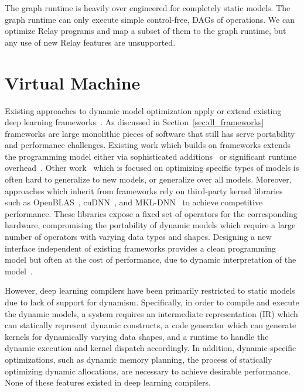 The graph runtime is heavily over engineered for completely static
  models.
The graph runtime can only execute simple control-free,
    DAGs of operations.
We can optimize Relay programs and map a subset of them
    to the graph runtime, but any use of new Relay features
    are unsupported.

\section{Virtual Machine}
\label{sec:vm}

Existing approaches to dynamic model optimization apply or extend existing
  deep learning frameworks~\citep{xu2018cavs, gao2018low, yu2018dynamic, jeong2018improving, jeong2019janus, dynet, tf_fold}.
As discussed in Section~\ref{sec:dl_frameworks} frameworks are large monolithic pieces
  of software that still has serve portability and performance challenges.
Existing work which builds on frameworks extends the programming model either
  via sophisticated additions~\citep{yu2018dynamic} or significant runtime overhead~\citep{tf_fold, jeong2019janus}.
Other work~\citep{xu2018cavs, gao2018low, tf_fold} which is focused on optimizing specific types of models
  is often hard to generalize to new models, or generalize over all models.
Moreover, approaches which inherit from frameworks rely on third-party kernel libraries such as
  OpenBLAS~\citep{xianyi2014openblas}, cuDNN~\citep{cudnn}, and MKL-DNN~\citep{mkldnn} to achieve competitive performance.
These libraries expose a fixed set of operators for the corresponding hardware, compromising the portability of dynamic models
  which require a large number of operators with varying data types and shapes.
Designing a new interface independent of existing frameworks
  provides a clean programming model but often at the cost of performance, due to dynamic interpretation of the model~\citep{dynet}.

However, deep learning compilers have been primarily restricted
  to static models due to lack of support for dynamism.
Specifically, in order to compile and execute the dynamic models,
  a system requires an intermediate representation (IR) which can statically represent dynamic constructs,
  a code generator which can generate kernels for dynamically varying data shapes,
  and a runtime to handle the dynamic execution and kernel dispatch accordingly.
In addition, dynamic-specific optimizations, such as dynamic memory planning, the process of statically optimizing dynamic allocations,
  are necessary to achieve desirable performance.
None of these features existed in deep learning compilers.

